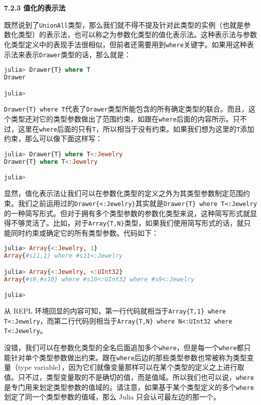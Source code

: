 \textbf{7.2.3 值化的表示法}

既然说到了\verb|UnionAll|类型，那么我们就不得不提及针对此类型的实例（也就是参数化类型）的表示法，也可以称之为参数化类型的值化表示法。这种表示法与参数化类型定义中的表现手法很相似，但前者还需要用到\verb|where|关键字。如果用这种表示法来表示\verb|Drawer|类型的话，那么就是：
\begin{lstlisting}[language=julia]
julia> Drawer{T} where T
Drawer

julia> 
\end{lstlisting}

\verb|Drawer{T} where T|代表了\verb|Drawer|类型所能包含的所有确定类型的联合。而且，这个类型还对它的类型参数做出了范围约束，如跟在\verb|where|后面的内容所示。只不过，这里在\verb|where|后面的只有\verb|T|，所以相当于没有约束。如果我们想为这里的\verb|T|添加约束，那么可以像下面这样写：
\begin{lstlisting}[language=julia]
julia> Drawer{T} where T<:Jewelry
Drawer{T} where T<:Jewelry

julia> 
\end{lstlisting}

显然，值化表示法让我们可以在参数化类型的定义之外为其类型参数制定范围约束。我们之前运用过的\verb|Drawer{<:Jewelry}|其实就是\verb|Drawer{T} where T<:Jewelry|的一种简写形式。但对于拥有多个类型参数的参数化类型来说，这种简写形式就显得不够灵活了。比如，对于\verb|Array{T,N}|类型，如果我们使用简写形式的话，就只能同时约束或确定它的所有类型参数。代码如下：
\begin{lstlisting}[language=julia]
julia> Array{<:Jewelry, 1}
Array{#s11,1} where #s11<:Jewelry

julia> Array{<:Jewelry, <:UInt32}
Array{#s9,#s10} where #s10<:UInt32 where #s9<:Jewelry

julia> 
\end{lstlisting}

从 REPL 环境回显的内容可知，第一行代码就相当于\verb|Array{T,1} where T<:Jewelry|，而第二行代码则相当于\verb|Array{T,N} where N<:UInt32 where T<:Jewelry|。

没错，我们可以在参数化类型的全名后面追加多个\verb|where|，但是每一个\verb|where|都只能针对单个类型参数做出约束。跟在\verb|where|后边的那些类型参数也常被称为类型变量（type variable），因为它们就像变量那样可以在某个类型的定义之上进行取值。只不过，类型变量取的不是确切的值，而是值域。所以我们也可以说，\verb|where|是专门用来划定类型参数的值域的。请注意，如果基于某个类型定义的多个\verb|where|划定了同一个类型参数的值域，那么 Julia 只会认可最左边的那一个。

